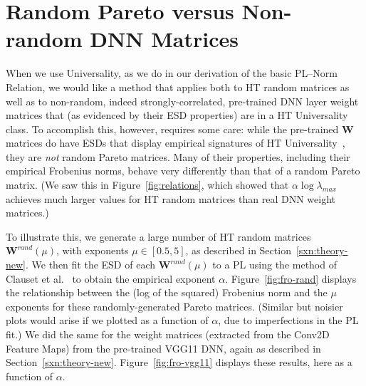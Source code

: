 {\section{Random Pareto versus Non-random DNN Matrices} 
\label{sxn:appendix-universality}

When we use Universality, as we do in our derivation of the basic PL--Norm Relation, we would like a method that applies both to HT random matrices as well as to non-random, indeed strongly-correlated, pre-trained DNN layer weight matrices that (as evidenced by their ESD properties) are in a HT Universality class.  
To accomplish this, however, requires some care: while the pre-trained $\mathbf{W}$ matrices do have ESDs that display empirical signatures of HT Universality~\cite{MM18_TR}, they are \emph{not} random Pareto matrices.
Many of their properties, including their empirical Frobenius norms, behave very differently than that of a random Pareto matrix.  
(We saw this in Figure~\ref{fig:relations}, which showed that $ \alpha\log\lambda_{max} $ achieves much larger values for HT random matrices than real DNN weight matrices.)

To illustrate this, we generate a large number of HT random matrices $\mathbf{W}^{rand}(\mu)$, with exponents $\mu\in[0.5, 5]$, as described in Section~\ref{sxn:theory-new}.
%
We then fit the ESD of each $\mathbf{W}^{rand}(\mu)$ to a PL using the method of Clauset et al.~\cite{CSN09_powerlaw,ABP14} to obtain the empirical exponent $\alpha$. 
Figure~\ref{fig:fro-rand} displays the relationship between the (log of the squared) Frobenius norm and the $\mu$ exponents for these randomly-generated Pareto matrices.
(Similar but noisier plots would arise if we plotted as a function of $\alpha$, due to imperfections in the PL fit.)
We did the same for the weight matrices (extracted from the Conv2D Feature Maps) from the pre-trained VGG11 DNN, again as described in Section~\ref{sxn:theory-new}.
Figure~\ref{fig:fro-vgg11} displays these results, here as a function of $\alpha$.

}
